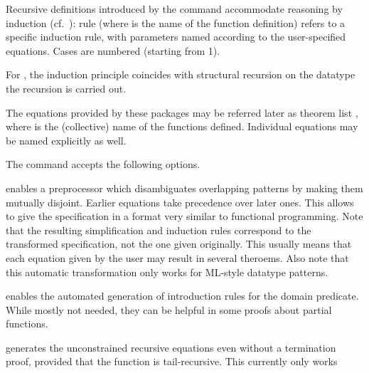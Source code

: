 \begin{isabellebody}
\begin{isamarkuptext}
\begin{description}
  \end{description}

  Recursive definitions introduced by the \hyperlink{command.HOL.function}{\mbox{}}
  command accommodate
  reasoning by induction (cf.\ ): rule  (where  is the name of the function definition)
  refers to a specific induction rule, with parameters named according
  to the user-specified equations. Cases are numbered (starting from 1).

  For \hyperlink{command.HOL.primrec}{\mbox{}}, the induction principle coincides
  with structural recursion on the datatype the recursion is carried
  out.

  The equations provided by these packages may be referred later as
  theorem list , where  is the (collective)
  name of the functions defined.  Individual equations may be named
  explicitly as well.

  The \hyperlink{command.HOL.function}{\mbox{}} command accepts the following
  options.

  \begin{description}

  \item {} enables a preprocessor which disambiguates
  overlapping patterns by making them mutually disjoint.  Earlier
  equations take precedence over later ones.  This allows to give the
  specification in a format very similar to functional programming.
  Note that the resulting simplification and induction rules
  correspond to the transformed specification, not the one given
  originally. This usually means that each equation given by the user
  may result in several theroems.  Also note that this automatic
  transformation only works for ML-style datatype patterns.

  \item {} enables the automated generation of
  introduction rules for the domain predicate. While mostly not
  needed, they can be helpful in some proofs about partial functions.

  \item {} generates the unconstrained recursive
  equations even without a termination proof, provided that the
  function is tail-recursive. This currently only works


\end{description}
\end{isamarkuptext}
\end{isabellebody}
